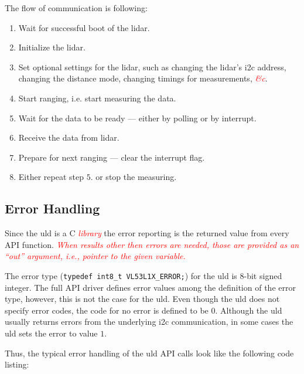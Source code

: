\documentclass[
  digital,     %
  oneside,     %
  nosansbold,  %
  nocolorbold, %
  lof,         %
  lot,         %
]{fithesis4}
\newcommand{\TODO}[1]{\textcolor{red}{\textit{#1}}}
\begin{document}
{{{The flow of communication is following:
\begin{enumerate}
    \item Wait for successful boot of the \acrshort{lidar}.
    
    \item Initialize the \acrshort{lidar}.
    
    \item  Set optional settings for the \acrshort{lidar}, such as changing the \acrshort{lidar}'s \acrshort{i2c} address, changing the distance mode, changing timings for measurements, \TODO{\&c}.
    
    \item Start ranging, i.e. start measuring the data.
    
    \item Wait for the data to be ready --- either by polling or by interrupt.
    
    \item Receive the data from \acrshort{lidar}.
    
    \item Prepare for next ranging --- clear the interrupt flag.
    
    \item Either repeat step $5.$ or stop the measuring.
\end{enumerate}


\subsection{ Error Handling }

Since the \acrshort{uld} is a C \TODO{library} the error reporting is the returned value from every API function. \TODO{When results other then errors are needed, those are provided as an ``out'' argument, i.e., pointer to the given variable.}

The error type (\lstinline[breaklines=false]|typedef int8_t VL53L1X_ERROR;|) for the \acrshort{uld} is 8-bit signed integer. The full API driver defines error values among the definition of the error type, however, this is not the case for the \acrshort{uld}. Even though the \acrshort{uld} does not specify error codes, the code for no error is defined to be $0$. Although the \acrshort{uld} usually returns errors from the underlying \acrshort{i2c} communication, in some cases the \acrshort{uld} sets the error to value $1$.

Thus, the typical error handling of the \acrshort{uld} API calls look like the following code listing:

}}}
\end{document}
